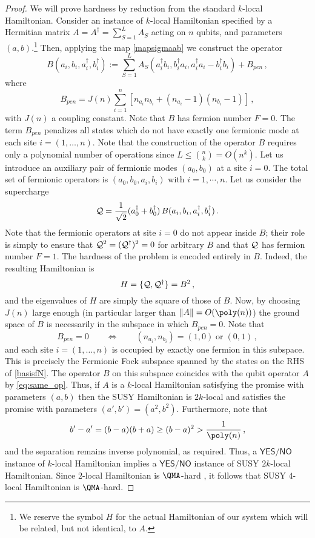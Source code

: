 \documentclass[11pt]{article}
\numberwithin{equation}{section}
\def\cQ{{\cal Q}}
\newcommand{\yes}{\mathsf{YES}}
\newcommand{\no}{\mathsf{NO}}
\newcommand\equ[1] {\begin{equation}#1\end{equation}}
\renewcommand\( {\left(}
\renewcommand\) {\right)}
\begin{document}
\begin{proof} 

We will prove hardness by reduction from the standard  {\sc $k$-local Hamiltonian}.  
%
Consider an instance of  {\sc $k$-local Hamiltonian}  specified by a Hermitian matrix $A=A^{\dagger}=\sum_{S=1}^{L}A_{S}$ acting on $n$ qubits, and parameters $(a,b)$.\footnote{We reserve the symbol $H$ for the actual Hamiltonian of our system which will be related, but not identical, to $A$.} Then, applying the map \eqref{mapsigmaab} we construct the operator
\equ{
B(a_i,b_i,a_i^{\dagger},b_i^{\dagger}):= \sum_{S=1}^{L}A_{S}\(a_i^{\dagger}b_i,b_i^{\dagger}a_i,a_i^{\dagger}a_i-b_i^{\dagger}b_i\)+B_{\mathit{pen}}\,,
}
where
\equ{
B_{\mathit{pen}}= J(n)\sum_{i=1}^{n} \left[n_{a_i} n_{b_i}+(n_{a_i}-1)( n_{b_i}-1)\right]\,,
}
with $J(n)$ a coupling constant. Note that $B$ has fermion number $F=0$. The term $B_{\mathit{pen}}$ penalizes all states which do not have exactly one fermionic mode at each site $i=(1,\dots,n)$. Note that the construction of the operator $B$ requires only a polynomial number of operations since  $L\leq {n \choose k} = O(n^k)$. Let us introduce an auxiliary pair of fermionic modes $(a_{0},b_{0})$ at a site $i=0$. The total set of fermionic operators is  $(a_{0},b_{0},a_{i},b_{i})$ with $i=1,\cdots,n$. Let us consider the supercharge 
\equ{
\cQ= \frac{1}{\sqrt 2}(a_{0}^{\dagger} +b_{0}^{\dagger} )\, B(a_{i},b_{i},a_{i}^{\dagger},b_{i}^{\dagger})\,.
}
Note that the fermionic operators at site $i=0$ do not appear inside $B$; their role is simply to ensure that $\cQ^{2}=(\cQ^{\dagger})^{2}=0$ for arbitrary $B$ and that $\cQ$ has fermion number $F=1$. The hardness of the problem is encoded entirely in $B$. Indeed, the resulting Hamiltonian is 
\equ{\label{SUSYHB2} 
H=\{\cQ,\cQ^{\dagger}\}= B^{2}\,,
} 
and the eigenvalues of $H$ are simply the square of those of $B$. Now, by choosing $J(n)$ large enough (in particular larger than $\|A\| = O(\poly(n))$) the ground space of $B$ is necessarily in the subspace in which $B_{\mathit pen}=0$. Note that 
\equ{
B_{\mathit pen}=0\qquad \Leftrightarrow \qquad (n_{a_i},n_{b_i})=(1,0) \; \text{or} \; (0,1)\,,
}
and  each site $i=(1,\dots,n)$ is occupied by exactly one fermion in this subspace. This is precisely the Fermionic Fock subspace spanned by the states on the RHS of \eqref{basisfN}. The operator $B$ on this subspace coincides with the qubit operator $A$ by \eqref{eq:same_op}.  Thus, if $A$ is a $k$-local Hamiltonian  satisfying the promise with parameters $(a,b)$ then the SUSY Hamiltonian is $2k$-local and satisfies the promise with parameters $(a',b')=(a^{2},b^{2})$. Furthermore, note that
\equ{
b'-a'=(b-a)(b+a)\geq (b-a)^{2}> \frac{1}{\poly(n)}\,,
}
and the separation remains inverse polynomial, as required. Thus, a $\yes/\no$ instance of {\sc $k$-local Hamiltonian} implies a $\yes/\no$ instance of {\sc SUSY $2k$-local  Hamiltonian}. Since  {\sc $2$-local Hamiltonian} is $\QMA$-hard \cite{2004quant.ph..6180K}, it follows that {\sc SUSY $4$-local Hamiltonian} is $\QMA$-hard. 
\end{proof} 
\end{document}

